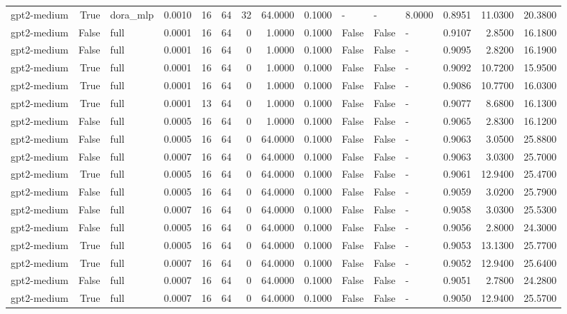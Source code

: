 \begin{tabular}{lrlrrrrrrlllrrr}
gpt2-medium & True & dora_mlp & 0.0010 & 16 & 64 & 32 & 64.0000 & 0.1000 & - & - & 8.0000 & 0.8951 & 11.0300 & 20.3800 \\
gpt2-medium & False & full & 0.0001 & 16 & 64 & 0 & 1.0000 & 0.1000 & False & False & - & 0.9107 & 2.8500 & 16.1800 \\
gpt2-medium & False & full & 0.0001 & 16 & 64 & 0 & 1.0000 & 0.1000 & False & False & - & 0.9095 & 2.8200 & 16.1900 \\
gpt2-medium & True & full & 0.0001 & 16 & 64 & 0 & 1.0000 & 0.1000 & False & False & - & 0.9092 & 10.7200 & 15.9500 \\
gpt2-medium & True & full & 0.0001 & 16 & 64 & 0 & 1.0000 & 0.1000 & False & False & - & 0.9086 & 10.7700 & 16.0300 \\
gpt2-medium & True & full & 0.0001 & 13 & 64 & 0 & 1.0000 & 0.1000 & False & False & - & 0.9077 & 8.6800 & 16.1300 \\
gpt2-medium & False & full & 0.0005 & 16 & 64 & 0 & 1.0000 & 0.1000 & False & False & - & 0.9065 & 2.8300 & 16.1200 \\
gpt2-medium & False & full & 0.0005 & 16 & 64 & 0 & 64.0000 & 0.1000 & False & False & - & 0.9063 & 3.0500 & 25.8800 \\
gpt2-medium & False & full & 0.0007 & 16 & 64 & 0 & 64.0000 & 0.1000 & False & False & - & 0.9063 & 3.0300 & 25.7000 \\
gpt2-medium & True & full & 0.0005 & 16 & 64 & 0 & 64.0000 & 0.1000 & False & False & - & 0.9061 & 12.9400 & 25.4700 \\
gpt2-medium & False & full & 0.0005 & 16 & 64 & 0 & 64.0000 & 0.1000 & False & False & - & 0.9059 & 3.0200 & 25.7900 \\
gpt2-medium & False & full & 0.0007 & 16 & 64 & 0 & 64.0000 & 0.1000 & False & False & - & 0.9058 & 3.0300 & 25.5300 \\
gpt2-medium & False & full & 0.0005 & 16 & 64 & 0 & 64.0000 & 0.1000 & False & False & - & 0.9056 & 2.8000 & 24.3000 \\
gpt2-medium & True & full & 0.0005 & 16 & 64 & 0 & 64.0000 & 0.1000 & False & False & - & 0.9053 & 13.1300 & 25.7700 \\
gpt2-medium & True & full & 0.0007 & 16 & 64 & 0 & 64.0000 & 0.1000 & False & False & - & 0.9052 & 12.9400 & 25.6400 \\
gpt2-medium & False & full & 0.0007 & 16 & 64 & 0 & 64.0000 & 0.1000 & False & False & - & 0.9051 & 2.7800 & 24.2800 \\
gpt2-medium & True & full & 0.0007 & 16 & 64 & 0 & 64.0000 & 0.1000 & False & False & - & 0.9050 & 12.9400 & 25.5700 \\

\end{tabular}
